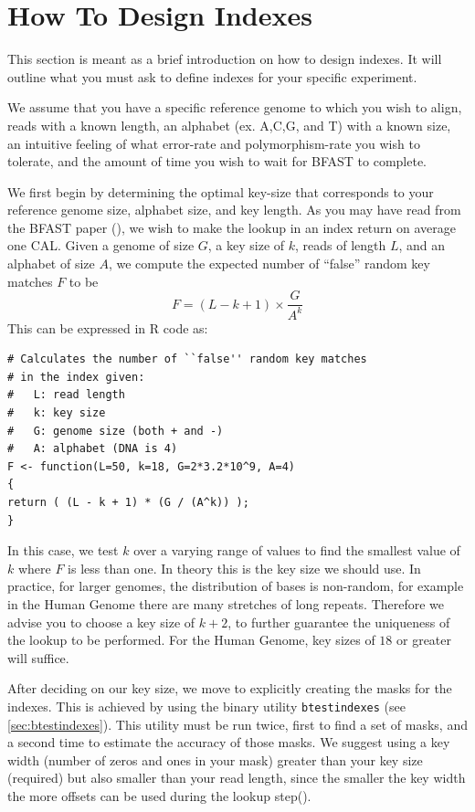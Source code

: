 \documentclass[a4paper,12pt]{book}
\newcommand{\TT}[1]{{\tt #1}} %
\begin{document}
\section{How To Design  Indexes}
\label{sec:design-indexes}
This section is meant as a brief introduction on how to design indexes.
It will outline what you must ask to define indexes for your specific experiment.

We assume that you have a specific reference genome to which you wish to align, reads with a known length, an alphabet (ex. A,C,G, and T) with a known size, an intuitive feeling of what error-rate and polymorphism-rate you wish to tolerate, and the amount of time you wish to wait for BFAST to complete.

We first begin by determining the optimal key-size that corresponds to your reference genome size, alphabet size, and key length.
As you may have read from the BFAST paper (\cite{BFAST}), we wish to make the lookup in an index return on average one CAL.
Given a genome of size $G$, a key size of $k$, reads of length $L$, and an alphabet of size $A$, we compute the expected number of ``false'' random key matches $F$ to be
\[F=(L-k+1)\times \frac{G}{A^k}\]
This can be expressed in R code as:
\begin{verbatim}
# Calculates the number of ``false'' random key matches
# in the index given:
#   L: read length
#   k: key size
#   G: genome size (both + and -)
#   A: alphabet (DNA is 4)
F <- function(L=50, k=18, G=2*3.2*10^9, A=4)
{
return ( (L - k + 1) * (G / (A^k)) );
}
\end{verbatim}
In this case, we test $k$ over a varying range of values to find the smallest value of $k$ where $F$ is less than one.
In theory this is the key size we should use.
In practice, for larger genomes, the distribution of bases is non-random, for example in the Human Genome there are many stretches of long repeats.
Therefore we advise you to choose a key size of $k+2$, to further guarantee the uniqueness of the lookup to be performed.
For the Human Genome, key sizes of $18$ or greater will suffice.

After deciding on our key size, we move to explicitly creating the masks for the indexes.
This is achieved by using the binary utility \TT{btestindexes} (see \autoref{sec:btestindexes}).
This utility must be run twice, first to find a set of masks, and a second time to estimate the accuracy of those masks.
We suggest using a key width (number of zeros and ones in your mask) greater than your key size (required) but also smaller than your read length, since the smaller the key width the more offsets can be used during the lookup step(\cite{BFAST}).
\end{document}
